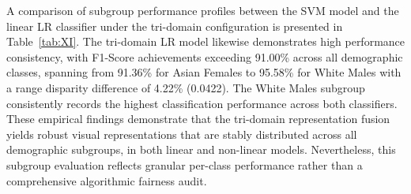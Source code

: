 A comparison of subgroup performance profiles between the SVM model and the linear LR classifier under the tri-domain configuration is presented in Table~\ref{tab:XI}. The tri-domain LR model likewise demonstrates high performance consistency, with F1-Score achievements exceeding 91.00\% across all demographic classes, spanning from 91.36\% for Asian Females to 95.58\% for White Males with a range disparity difference of 4.22\% (0.0422). The White Males subgroup consistently records the highest classification performance across both classifiers. These empirical findings demonstrate that the tri-domain representation fusion yields robust visual representations that are stably distributed across all demographic subgroups, in both linear and non-linear models. Nevertheless, this subgroup evaluation reflects granular per-class performance rather than a comprehensive algorithmic fairness audit.
